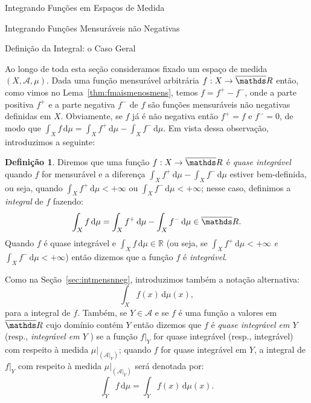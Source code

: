 \documentclass[oneside,final,11pt]{amsbook}
\newcommand{\R}{\mathds R}
\newcommand{\dd}{\mathrm d}
\theoremstyle{remark}\newtheorem{exercise}{Exercício}[chapter]
\theoremstyle{remark}\newtheorem{*exercise}[exercise]{\hbox to 0pt{\hskip 0pt minus 1fil*}Exercício}
\theoremstyle{definition}\newtheorem{exdefin}{Definição}[chapter]
\theoremstyle{plain}\newtheorem{teo}{Teorema}[section]
\theoremstyle{plain}\newtheorem{lem}[teo]{Lema}
\theoremstyle{plain}\newtheorem{prop}[teo]{Proposição}
\theoremstyle{plain}\newtheorem{cor}[teo]{Corolário}
\theoremstyle{definition}\newtheorem{defin}[teo]{Definição}
\theoremstyle{remark}\newtheorem{rem}[teo]{Observação}
\theoremstyle{definition}\newtheorem{notation}[teo]{Notação}
\theoremstyle{definition}\newtheorem{convention}[teo]{Convenção}
\theoremstyle{definition}\newtheorem{example}[teo]{Exemplo}
\numberwithin{section}{chapter}
\numberwithin{equation}{section}
\begin{document}
\begin{chapter}{Integrando Funções em Espaços de Medida}
\begin{section}{Integrando Funções Mensuráveis não Negativas}
\end{section}

\begin{section}{Definição da Integral: o Caso Geral}

Ao longo de toda esta seção consideramos fixado um espaço de medida $(X,\mathcal A,\mu)$.
Dada uma função mensurável arbitrária $f:X\to\overline\R$ então, como vimos no Lema~\ref{thm:fmaismenosmens},
temos $f=f^+-f^-$, onde a parte positiva $f^+$ e a parte negativa $f^-$ de $f$ são funções mensuráveis
não negativas definidas em $X$. Obviamente, se $f$ já é não negativa então $f^+=f$ e $f^-=0$,
de modo que $\int_Xf\,\dd\mu=\int_Xf^+\,\dd\mu-\int_Xf^-\,\dd\mu$. Em vista dessa observação,
introduzimos a seguinte:
\begin{defin}
Diremos que uma função $f:X\to\overline\R$ é
{\em quase integrável\/}
quando $f$ for mensurável e a diferença $\int_Xf^+\,\dd\mu-\int_Xf^-\,\dd\mu$
estiver bem-definida, ou seja, quando $\int_Xf^+\,\dd\mu<+\infty$ ou $\int_Xf^-\,\dd\mu<+\infty$;
nesse caso, definimos a
{\em integral\/}%
de $f$ fazendo:\index[simbolos]{$\int_Xf\,\dd\mu$}
\[\int_Xf\,\dd\mu=\int_Xf^+\,\dd\mu-\int_Xf^-\,\dd\mu\in\overline\R.\]
Quando $f$ é quase integrável e $\int_Xf\,\dd\mu\in\R$ (ou seja, se $\int_Xf^+\,\dd\mu<+\infty$
{\em e\/} $\int_Xf^-\,\dd\mu<+\infty$) então dizemos que a função $f$
é {\em integrável}.
\end{defin}

Como na Seção~\ref{sec:intmensnneg}, introduzimos também a notação alternativa:
\index[simbolos]{$\int_Xf(x)\,\dd\mu(x)$}\[\int_Xf(x)\,\dd\mu(x),\]
para a integral de $f$. Também, se $Y\in\mathcal A$ e se $f$ é uma função a valores em $\overline\R$
cujo domínio contém $Y$ então dizemos que $f$ é
{\em quase integrável em $Y$\/}%
(resp., {\em integrável em $Y$}%
)
se a função $f\vert_Y$ for quase integrável (resp., integrável)
com respeito à medida $\mu\vert_{(\mathcal A\vert_Y)}$; quando $f$ for quase integrável em $Y$,
a integral de $f\vert_Y$ com respeito à medida $\mu\vert_{(\mathcal A\vert_Y)}$ será denotada por:
\[\int_Yf\,\dd\mu=\int_Yf(x)\,\dd\mu(x).\]


\end{section}
\end{chapter}
\end{document}
